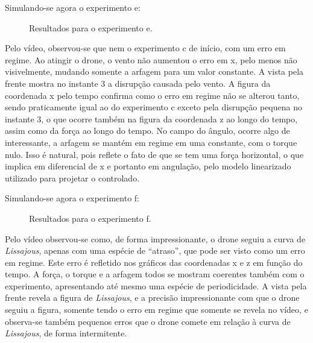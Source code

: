\documentclass[a4paper]{article}
\begin{document}
	Simulando-se agora o experimento e:
	\begin{figure}[H]
		\centering
		\caption{Resultados para o experimento e.}
	\end{figure}
	Pelo v\'ideo, observou-se que nem o experimento c de in\'icio, com um erro em regime. Ao
	atingir o drone, o vento n\~ao aumentou o erro em x, pelo menos n\~ao visivelmente, mudando
	somente a arfagem para um valor constante. A vista pela frente mostra no instante 3
	a disrup\c{c}\~ao causada pelo vento. A figura da coordenada x pelo tempo confirma como
	o erro em regime n\~ao se alterou tanto, sendo praticamente igual ao do experimento c
	exceto pela disrup\c{c}\~ao pequena no instante 3, o que ocorre tamb\'em na figura da
	coordenada z ao longo do tempo, assim como da for\c{c}a ao longo do tempo. No campo do
	\^angulo, ocorre algo de interessante, a arfagem se mant\'em em regime em uma constante,
	com o torque nulo. Isso \'e natural, pois reflete o fato de que se tem uma for\c{c}a
	horizontal, o que implica em diferencial de x e portanto em angula\c{c}\~ao, pelo modelo
	linearizado utilizado para projetar o controlado.

	Simulando-se agora o experimento f:
	\begin{figure}[H]
		\centering
		\caption{Resultados para o experimento f.}
	\end{figure}
	Pelo v\'ideo observou-se como, de forma impressionante, o drone seguiu a curva de
	\textit{Lissajous}, apenas com uma esp\'ecie de ``atraso'', que pode ser visto como um
	erro em regime. Este erro \'e refletido nos gr\'aficos das coordenadas x e z em fun\c{c}\~ao
	do tempo. A for\c{c}a, o torque e a arfagem todos se mostram coerentes tamb\'em com o
	experimento, apresentando at\'e mesmo uma esp\'ecie de periodicidade. A vista pela frente
	revela a figura de \textit{Lissajous}, e a precis\~ao impressionante com que o drone
	seguiu a figura, somente tendo o erro em regime que somente se revela no v\'ideo,
	e observa-se tamb\'em pequenos erros que o drone comete em rela\c{c}\~ao \`a curva
	de \textit{Lissajous}, de forma intermitente.
\end{document}
